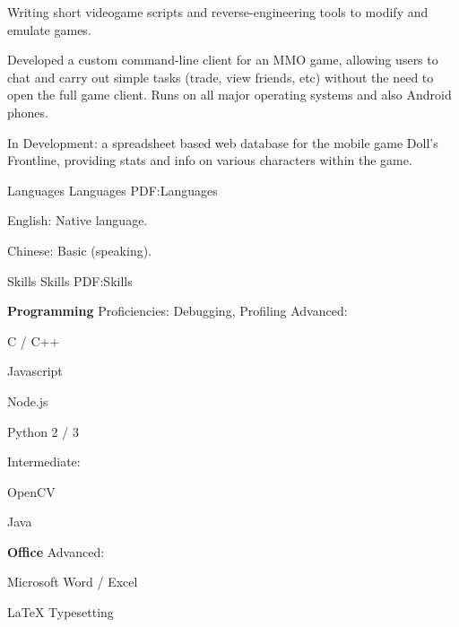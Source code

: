 \documentclass[letterpaper,MMMyyyy,nonstopmode]{simpleresumecv}
\begin{document}
\begin{Body}
Writing short videogame scripts and reverse-engineering tools to modify and emulate games.

Developed a custom command-line client for an MMO game, allowing users to chat and carry out simple tasks (trade, view friends, etc) without the need to open the full game client. Runs on all major operating systems and also Android phones.

In Development: a spreadsheet based web database for the mobile game Doll's Frontline, providing stats and info on various characters within the game.


\Section
{Languages}
{Languages}
{PDF:Languages}

\BulletItem
English: Native language.

\Gap
\BulletItem
Chinese: Basic (speaking).


\Section
{Skills}
{Skills}
{PDF:Skills}

\Entry
{\textbf{Programming}}
\Gap
Proficiencies: Debugging, Profiling
\Gap
Advanced:
\begin{enumerate*}[label=\SubBulletSymbol]
\item C / C++
\item Javascript
\item Node.js
\item Python 2 / 3
\end{enumerate*}
\Gap
Intermediate:
\begin{enumerate*}[label=\SubBulletSymbol]
\item OpenCV
\item Java
\end{enumerate*}
\Gap

\Entry
{\textbf{Office}}
\Gap
Advanced:
\begin{enumerate*}[label=\SubBulletSymbol]
\item Microsoft Word / Excel
\item LaTeX Typesetting

\end{enumerate*}

\end{Body}
\end{document}
